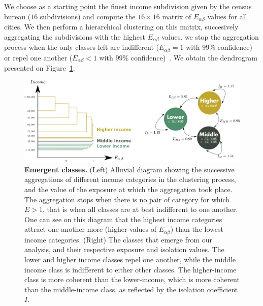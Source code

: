 We choose as a starting point the finest income subdivision given by the census
bureau ($16$ subdivisions) and compute the $16 \times 16$ matrix of $E_{\alpha
\beta}$ values for all cities. We then perform a hierarchical clustering on this
matrix, succesively aggregating the subdivisions with the highest $E_{\alpha
\beta}$ values. we stop the aggregation process when the only classes left are
indifferent ($E_{\alpha \beta} = 1$ with $99\%$ confidence) or
repel one another ($E_{\alpha \beta} < 1$ with $99\%$
confidence)~\cite{Louf:2015}. We obtain the dendrogram presented on
Figure~\ref{fig:classes_alluvial}.

\begin{figure}
    \includegraphics[width=\textwidth]{./gfx/chapter-segregation/figure1.pdf}
    \caption{{\bf Emergent classes.} (Left) Alluvial diagram showing the successive aggregations
      of different income categories in the clustering process, and
      the value of the exposure at which the aggregation took
      place. The aggregation stops when there is no pair of category
      for which $E>1$, that is when all classes are at best
      indifferent to one another. One can see on this diagram that
      the highest income categories attract one another more (higher values of
      $E_{\alpha \beta}$) than the lowest income categories. (Right) The classes that emerge from our
      analysis, and their respective exposure and isolation values. The lower
      and higher income classes repel one another, while the middle
      income class is indifferent to either other classes.  The
      higher-income class is more coherent than the lower-income,
      which is more coherent than the middle-income class, as
      reflected by the isolation coefficient $I$.}
\label{fig:classes_alluvial}
\end{figure}

